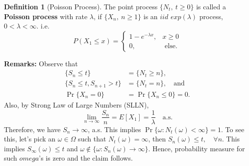 \documentclass[a4paper,10pt]{article}
\theoremstyle{plain}
\theoremstyle{definition}
\newtheorem{defn}[thm]{Definition}
\begin{document}
\begin{defn}[Poisson Process]
The point process $\{N_{t},~ t\geq0\} $ is called a \textbf{Poisson process} with rate $\lambda$, if $\{X_{n},~n\geq 1\}$ is an $iid$ $exp(\lambda)$ process, $ 0<\lambda<\infty$.  i.e.
 \begin{equation*}
  P(X_{1}\leq x) = 
	\begin{cases}
		1-e^{-\lambda x}, & x\geq 0   \\
		0,  & \text{ else}.
	\end{cases}
\end{equation*}
\end{defn}

\textbf{Remarks:} Observe that 
\begin{align*}
\{S_{n}\leq t\} &=  \{N_{t}\geq n \},\\
\{S_{n}\leq t, S_{n+1}> t \} &= \{N_{t}= n\},\quad\mathrm{and} \\
\Pr\{X_{n} = 0\} &= \Pr\{X_n\leq 0\} = 0.
\end{align*}
Also, by Strong Law of Large Numbers (SLLN), 
\begin{equation*}
\lim_{n \to \infty} \frac{S_{n}}{n} = E[X_{1}] = \frac{1}{\lambda}\quad\mathrm{a.s.} 
\end{equation*}
Therefore, we have $S_n \rightarrow \infty$, a.s. This implies $\Pr\{\omega: N_{t}(\omega) < \infty\} =1$. To see this, let's pick an $\omega \in \Omega$ such that $ N_{t}(\omega) = \infty$, then $S_{n}(\omega)\leq t,\quad \forall n$. This implies $S_{\infty}(\omega)\leq t$  and $\omega \not\in \{\omega: S_{n}(\omega) \rightarrow \infty \}.$ Hence, probability measure for such $omega$'s is zero and the claim follows. 
\end{document}
